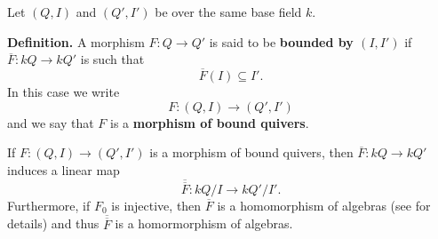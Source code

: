 \documentclass[12pt]{article}
\begin{document}
Let $(Q,I)$ and $(Q',I')$ be  over the same base field $k$.

\textbf{Definition.} A morphism $F:Q\to Q'$ is said to be \textbf{bounded by $(I,I')$} if  $\overline{F}:kQ\to kQ'$ is such that 
$$\overline{F}(I)\subseteq I'.$$
In this case we write
$$F:(Q,I)\to (Q',I')$$
and we say that $F$ is a \textbf{morphism of bound quivers}.

If $F:(Q,I)\to (Q',I')$ is a morphism of bound quivers, then $\overline{F}:kQ\to kQ'$ induces a linear map
$$\overline{\overline{F}}:kQ/I\to kQ'/I'.$$
Furthermore, if $F_0$ is injective, then $\overline{F}$ is a homomorphism of algebras (see  for details) and thus $\overline{\overline{F}}$ is a homormorphism of algebras.
\end{document}
